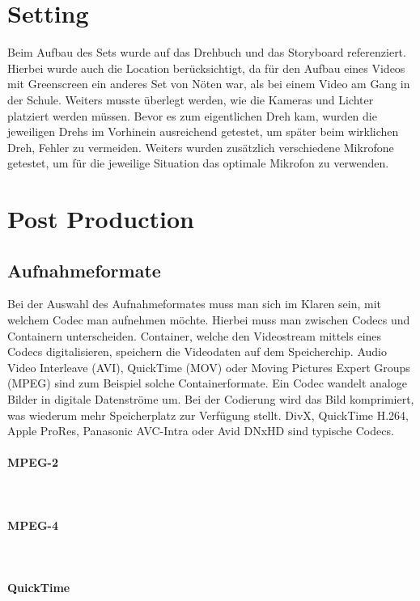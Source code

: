 \section{Setting}
Beim Aufbau des Sets wurde auf das Drehbuch und das Storyboard referenziert. Hierbei wurde auch die Location berücksichtigt, da für den Aufbau eines Videos mit Greenscreen ein anderes Set von Nöten war, als bei einem Video am Gang in der Schule. Weiters musste überlegt werden, wie die Kameras und Lichter platziert werden müssen. Bevor es zum eigentlichen Dreh kam, wurden die jeweiligen Drehs im Vorhinein ausreichend getestet, um später beim wirklichen Dreh, Fehler zu vermeiden. Weiters wurden zusätzlich verschiedene Mikrofone getestet, um für die jeweilige Situation das optimale Mikrofon zu verwenden.
\section{Post Production}
\subsection{Aufnahmeformate}
Bei der Auswahl des Aufnahmeformates muss man sich im Klaren sein, mit welchem Codec man aufnehmen möchte. Hierbei muss man zwischen Codecs und Containern unterscheiden. Container, welche den Videostream mittels eines Codecs digitalisieren, speichern die Videodaten auf dem Speicherchip. Audio Video Interleave (AVI), QuickTime (MOV) oder Moving Pictures Expert Groups (MPEG) sind zum Beispiel solche Containerformate. Ein Codec wandelt analoge Bilder in digitale Datenströme um. Bei der Codierung wird das Bild komprimiert, was wiederum mehr Speicherplatz zur Verfügung stellt. DivX, QuickTime H.264, Apple ProRes, Panasonic AVC-Intra oder Avid DNxHD sind typische Codecs. 
\paragraph{MPEG-2}
\leavevmode \\

\paragraph{MPEG-4}
\leavevmode \\

\paragraph{QuickTime}
\leavevmode \\

